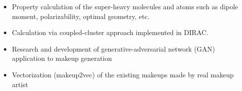 \begin{itemize}
\item Property calculation of the super-heavy molecules and atoms such as dipole moment, polarizability, optimal geometry, etc.
\item Calculation via coupled-cluster approach implemented in DIRAC.
\end{itemize}

\begin{itemize}
\item Research and development of generative-adversarial network (GAN) application to makeup generation
\item Vectorization (makeup2vec) of the existing makeups made by real makeup artist
\end{itemize}

\cvproject{}